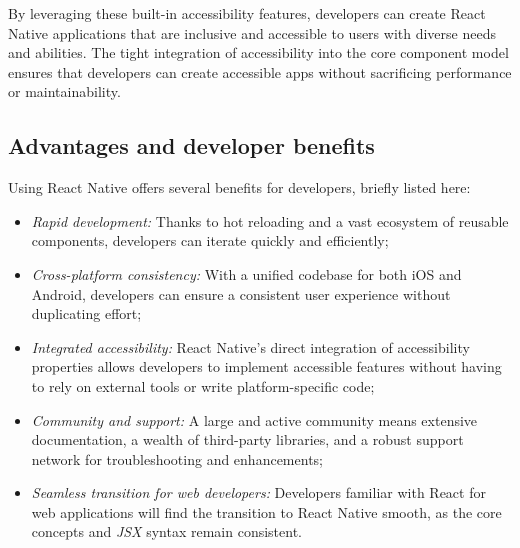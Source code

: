By leveraging these built-in accessibility features, developers can create React Native applications that are inclusive and accessible to users with diverse needs and abilities. The tight integration of accessibility into the core component model ensures that developers can create accessible apps without sacrificing performance or maintainability.

\subsection{Advantages and developer benefits}

Using React Native offers several benefits for developers, briefly listed here:
\begin{itemize}
    \item \textit{Rapid development:}  
    Thanks to hot reloading and a vast ecosystem of reusable components, developers can iterate quickly and efficiently;
    
    \item \textit{Cross-platform consistency:}  
    With a unified codebase for both iOS and Android, developers can ensure a consistent user experience without duplicating effort;
    
    \item \textit{Integrated accessibility:}  
    React Native’s direct integration of accessibility properties allows developers to implement accessible features without having to rely on external tools or write platform-specific code;
    
    \item \textit{Community and support:}  
    A large and active community means extensive documentation, a wealth of third-party libraries, and a robust support network for troubleshooting and enhancements;
    
    \item \textit{Seamless transition for web developers:}  
    Developers familiar with React for web applications will find the transition to React Native smooth, as the core concepts and \textit{JSX} syntax remain consistent.
\end{itemize}

